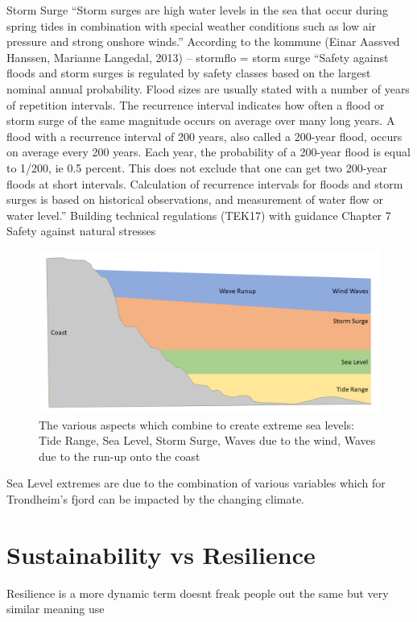 Storm Surge
“Storm surges are high water levels in the sea that occur during spring tides in combination with special weather conditions such as low air pressure and strong onshore winds.” According to the kommune (Einar Aassved Hanssen, Marianne Langedal, 2013) – stormflo = storm surge
“Safety against floods and storm surges is regulated by safety classes based on the
largest nominal annual probability. Flood sizes are usually stated with a number of
years of repetition intervals. The recurrence interval indicates how often a flood or
storm surge of the same magnitude occurs on average over many long years. A flood
with a recurrence interval of 200 years, also called a 200-year flood, occurs on average
every 200 years. Each year, the probability of a 200-year flood is equal to 1/200, ie 0.5 percent.
This does not exclude that one can get two 200-year floods at short intervals.
Calculation of recurrence intervals for floods and storm surges is based on historical
observations, and measurement of water flow or water level.”
Building technical regulations (TEK17) with guidance Chapter 7 Safety against natural stresses

\begin{figure}[h]
    \centering
    \includegraphics[width=1\textwidth]{fig_theory/sea level extremes.png}

    \caption{The various aspects which combine to create extreme sea levels: Tide Range, Sea Level, Storm Surge, Waves due to the wind, Waves due to the run-up onto the coast}
    \label{fig:my_label}
\end{figure}


Sea Level extremes are due to the combination of various variables which for Trondheim's fjord can be impacted by the changing climate. 

\section{Sustainability vs Resilience}
Resilience is a more dynamic term
doesnt freak people out the same
but very similar meaning
use \cite{moser_turbulent_2019}

